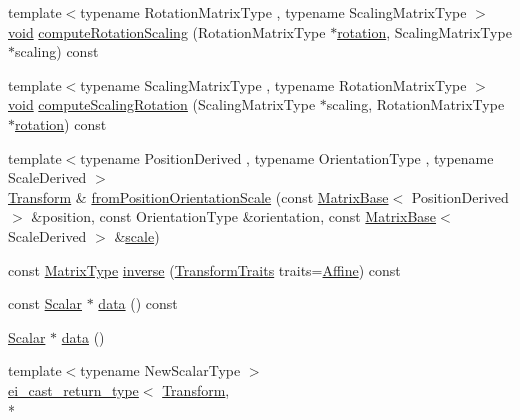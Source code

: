 \begin{DoxyCompactItemize}
\item 
{\footnotesize template$<$typename Rotation\-Matrix\-Type , typename Scaling\-Matrix\-Type $>$ }\\\hyperlink{group___u_a_v_objects_plugin_ga444cf2ff3f0ecbe028adce838d373f5c}{void} \hyperlink{class_transform_a0b06afcfd10f86347848e786053578ff}{compute\-Rotation\-Scaling} (Rotation\-Matrix\-Type $\ast$\hyperlink{class_transform_a3d5324a4905c6c83465ae72afbdcf947}{rotation}, Scaling\-Matrix\-Type $\ast$scaling) const 
\item 
{\footnotesize template$<$typename Scaling\-Matrix\-Type , typename Rotation\-Matrix\-Type $>$ }\\\hyperlink{group___u_a_v_objects_plugin_ga444cf2ff3f0ecbe028adce838d373f5c}{void} \hyperlink{class_transform_a99bb09e96c5d9404bafd986d5258d20e}{compute\-Scaling\-Rotation} (Scaling\-Matrix\-Type $\ast$scaling, Rotation\-Matrix\-Type $\ast$\hyperlink{class_transform_a3d5324a4905c6c83465ae72afbdcf947}{rotation}) const 
\item 
{\footnotesize template$<$typename Position\-Derived , typename Orientation\-Type , typename Scale\-Derived $>$ }\\\hyperlink{class_transform}{Transform} \& \hyperlink{class_transform_af77c7756392895bb83edf6670b7c3433}{from\-Position\-Orientation\-Scale} (const \hyperlink{class_matrix_base}{Matrix\-Base}$<$ Position\-Derived $>$ \&position, const Orientation\-Type \&orientation, const \hyperlink{class_matrix_base}{Matrix\-Base}$<$ Scale\-Derived $>$ \&\hyperlink{glext_8h_a281421b881aa7a1266842b73a3bc7655}{scale})
\item 
const \hyperlink{class_transform_afcdb9f1ab6b63ddfbc52789ef6319f33}{Matrix\-Type} \hyperlink{class_transform_a505a0c0f1d56c6d86e43bb2918a1cfcd}{inverse} (\hyperlink{_transform_8h_a302a826315506a7217d4b477ea78425f}{Transform\-Traits} traits=\hyperlink{_transform_8h_a302a826315506a7217d4b477ea78425fac0984f0c0fc7cdcea1c0bde170f9c925}{Affine}) const 
\item 
const \hyperlink{class_transform_a0468fefb805493a70f2100c7faf05489}{Scalar} $\ast$ \hyperlink{class_transform_ae025c7db5cc63e80fb8e77b07f73f2b9}{data} () const 
\item 
\hyperlink{class_transform_a0468fefb805493a70f2100c7faf05489}{Scalar} $\ast$ \hyperlink{class_transform_aab7a09cba41de6fbceb40811245c053b}{data} ()
\item 
{\footnotesize template$<$typename New\-Scalar\-Type $>$ }\\\hyperlink{structei__cast__return__type}{ei\-\_\-cast\-\_\-return\-\_\-type}$<$ \hyperlink{class_transform}{Transform}, \\*

\end{DoxyCompactItemize}
